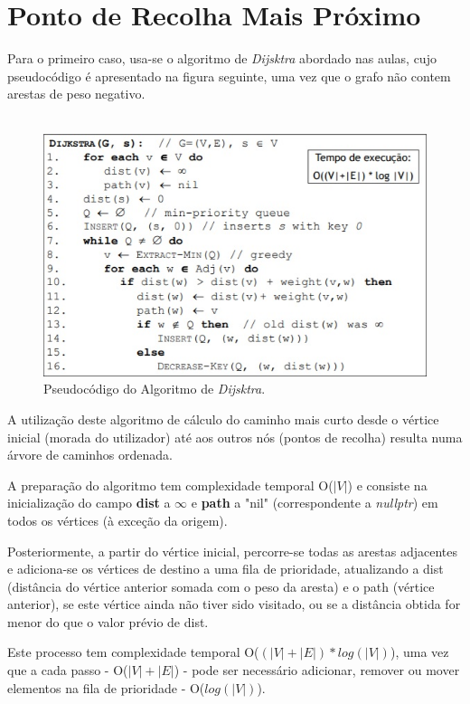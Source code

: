 \documentclass[article, a4paper, 12pt, oneside]{memoir}
\begin{document}
\section{Ponto de Recolha Mais Próximo}

Para o primeiro caso, usa-se o algoritmo de \textit{Dijsktra} abordado nas aulas, cujo pseudocódigo é apresentado na figura seguinte, uma vez que o grafo não contem arestas de peso negativo. \\\

\begin{figure}[h!]
  \centerline{\includegraphics[scale=1]{Dijkstra_pseudocode.jpg}}
  \caption{Pseudocódigo do Algoritmo de \textit{Dijsktra}.}
\end{figure}

A utilização deste algoritmo de cálculo do caminho mais curto desde o vértice inicial (morada do utilizador) até aos outros nós (pontos de recolha) resulta numa árvore de caminhos ordenada.

A preparação do algoritmo tem complexidade temporal O($|V|$) e consiste na inicialização do campo \textbf{dist} a $\infty$ e \textbf{path} a "nil" (correspondente a \textit{nullptr}) em todos os vértices (à exceção da origem).

Posteriormente, a partir do vértice inicial, percorre-se todas as arestas adjacentes e adiciona-se os vértices de destino a uma fila de prioridade, atualizando a dist (distância do vértice anterior somada com o peso da aresta) e o path (vértice anterior), se este vértice ainda não tiver sido visitado, ou se a distância obtida for menor do que o valor prévio de dist.

Este processo tem complexidade temporal O($(|V| + |E|)*log(|V|)$), uma vez que a cada passo - O($|V| + |E|$) - pode ser necessário adicionar, remover ou mover elementos na fila de prioridade - O($log(|V|)$).
	
\end{document}
